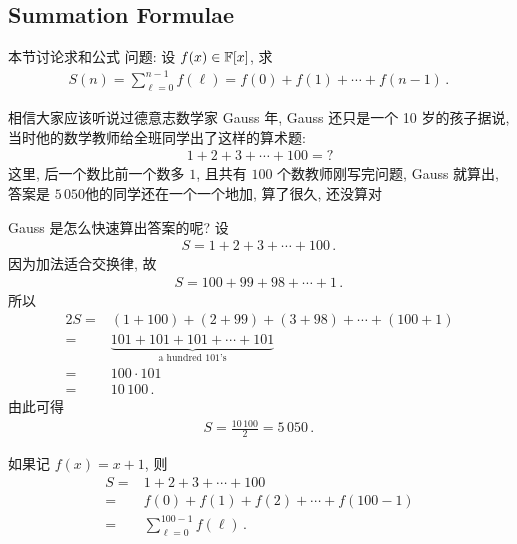 \subsection*{Summation Formulae}

本节讨论求和公式  问题: 设 $f(x) \in \mathbb{F}[x]$, 求
\begin{align*}
    S(n) = \sum_{\ell = 0}^{n - 1} f(\ell) = f(0) + f(1) + \cdots + f(n - 1) \period
\end{align*}

\begin{example}
    相信大家应该听说过德意志数学家 Gauss 年, Gauss 还只是一个 10 岁的孩子\period 据说, 当时他的数学教师给全班同学出了这样的算术题:
    \begin{align*}
        1 + 2 + 3 + \cdots + 100 = ?
    \end{align*}
    这里, 后一个数比前一个数多 $1$, 且共有 $100$ 个数\period 教师刚写完问题, Gauss 就算出, 答案是 $5\,050$\period 他的同学还在一个一个地加, 算了很久, 还没算对\period

    Gauss 是怎么快速算出答案的呢? 设
    \begin{align*}
        S = 1 + 2 + 3 + \cdots + 100 \period
    \end{align*}
    因为加法适合交换律, 故
    \begin{align*}
        S = 100 + 99 + 98 + \cdots + 1 \period
    \end{align*}
    所以
    \begin{align*}
        2S
        = {} & (1 + 100) + (2 + 99) + (3 + 98) + \cdots + (100 + 1) \\
        = {} & \underbrace{101 + 101 + 101 + \cdots + 101}
        _{\text{a hundred $101$'s}}                                 \\
        = {} & 100 \cdot 101                                        \\
        = {} & 10\,100 \period
    \end{align*}
    由此可得
    \begin{align*}
        S = \frac{10\,100}{2} = 5\,050 \period
    \end{align*}

    如果记 $f(x) = x + 1$, 则
    \begin{align*}
        S
        = {} & 1 + 2 + 3 + \cdots + 100                  \\
        = {} & f(0) + f(1) + f(2) + \cdots + f(100 - 1)  \\
        = {} & \sum_{\ell = 0}^{100 - 1} f(\ell) \period
    \end{align*}


\end{example}
